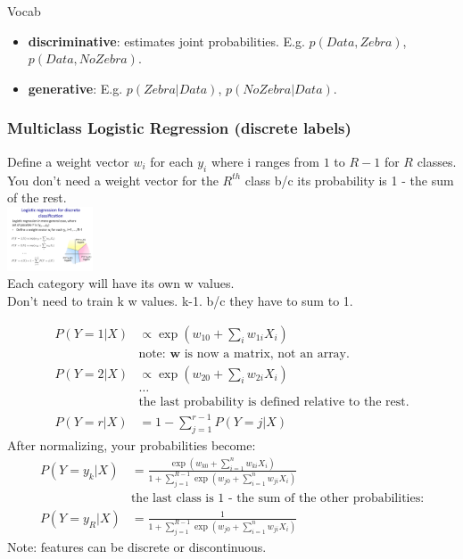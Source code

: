\hfill \\  \hfill \\


Vocab \hfill \\
\begin{itemize}
	\item \textbf{discriminative}:  estimates joint probabilities.  E.g. $p(Data, Zebra)$, $p(Data, No Zebra)$. 
	\item \textbf{generative}:  E.g. $p(Zebra | Data)$, $p(No Zebra | Data)$. 
\end{itemize}

\subsubsection{Multiclass Logistic Regression (discrete labels)}
Define a weight vector $w_i$ for each $y_i$ where i ranges from $1$ to $R-1$ for $R$ classes.
You don't need a weight vector for the $R^{th}$ class b/c its probability is 1 - the sum of the rest.  \hfill \\
\includegraphics[width=1in]{figures/multiclass_logistic.pdf} \hfill \\
Each category will have its own w values.  \hfill \\ %
Don't need to train k w values.  k-1.  b/c they have to sum to 1.    %

\begin {align*}
	P(Y=1 | X ) & \propto \exp(w_{10} + \sum_i w_{1i}X_i)  \\
		& \mbox{note: $\bm{w}$ is now a matrix, not an array.}  \\
	P(Y=2 | X ) & \propto \exp(w_{20} + \sum_i w_{2i}X_i)  \\
	 & \dots \\
	 & \mbox{the last probability is defined relative to the rest.}  \\
	P(Y=r | X ) &= 1- \sum_{j=1}^{r-1} P(Y=j | X)
\end{align*}
After normalizing, your probabilities become: 
\begin {align*}
	P(Y=y_k | X ) &=  \frac{\exp(w_{k0} + \sum_{i=1}^n w_{ki} X_i)}{1 + \sum_{j=1}^{R-1} \exp(w_{j0} + \sum_{i=1}^n w_{ji}X_i)} \\
	& \mbox{the last class is 1 - the sum of the other probabilities:} \\
	P(Y=y_R | X ) &=  \frac{1}{1 + \sum_{j=1}^{R-1} \exp(w_{j0} + \sum_{i=1}^n w_{ji}X_i)} 
\end{align*}
Note: features can be discrete or discontinuous. 
\hfill \\  \hfill \\

